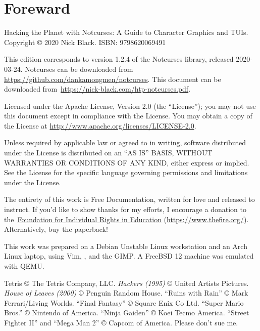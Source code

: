 \documentclass[letterpaper,10pt]{article}
\begin{document}
\cleardoublepage
{}
{}
\listoffigures
{}
\listoflistings
{}
\listoftables
\clearpage

\cleardoublepage
\section*{Foreward}
Hacking the Planet with Notcurses: A Guide to Character Graphics and TUIs.
Copyright © 2020 Nick Black.
ISBN: 9798620069491

This edition corresponds to version 1.2.4 of the Notcurses library, released
2020-03-24. Notcurses can be downloaded from
\url{https://github.com/dankamongmen/notcurses}. This document can be
downloaded from~\url{https://nick-black.com/htp-notcurses.pdf}.

Licensed under the Apache License, Version 2.0 (the ``License''); you may not
use this document except in compliance with the License. You may obtain a copy
of the License at \url{http://www.apache.org/licenses/LICENSE-2.0}.

Unless required by applicable law or agreed to in writing, software
distributed under the License is distributed on an ``AS IS'' BASIS,
WITHOUT WARRANTIES OR CONDITIONS OF ANY KIND, either express or implied.
See the License for the specific language governing permissions and
limitations under the License.

The entirety of this work is Free Documentation, written for love and released
to instruct. If you'd like to show thanks for my efforts, I encourage a donation to
the~\href{https://www.thefire.org/}{Foundation for Individual Rights in Education} (\url{https://www.thefire.org/}).
Alternatively, buy the paperback!

This work was prepared on a Debian Unstable Linux workstation and an Arch Linux laptop,
using Vim, \XeLaTeX, and the GIMP. A FreeBSD 12 machine was emulated with QEMU.

Tetris © The Tetris Company, LLC.
\textit{Hackers (1995)} © United Artists Pictures.
\textit{House of Leaves (2000)} © Penguin Random House.
``Ruins with Rain'' © Mark Ferrari/Living Worlds.
``Final Fantasy'' © Square Enix Co Ltd.
``Super Mario Bros.'' © Nintendo of America.
``Ninja Gaiden'' © Koei Tecmo America.
``Street Fighter II'' and ``Mega Man 2'' © Capcom of America.
Please don't sue me.
\end{document}

